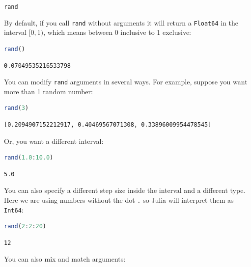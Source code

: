 \documentclass[
  notoc %
]{tufte-book}
\makeatletter
\newcommand{\passthrough}[1]{#1}
\renewcommand\subsubsection{%
\@startsection{subsubsection}{3}{\z@ }{-3.25ex\@plus -1ex \@minus -.2ex}{1.5ex \@plus .2ex}{\normalfont \normalsize \bfseries }
}
\makeatother
\begin{document}
\hypertarget{sec:random_rand}{%
\subsubsection{\texorpdfstring{\texttt{rand}}{rand}}\label{sec:random_rand}}

By default, if you call \passthrough{\lstinline!rand!} without arguments
it will return a \passthrough{\lstinline!Float64!} in the interval
\([0, 1)\), which means between 0 inclusive to 1 exclusive:

\begin{lstlisting}[language=Julia]
rand()
\end{lstlisting}

\begin{lstlisting}[language=Output]
0.07049535216533798
\end{lstlisting}

You can modify \passthrough{\lstinline!rand!} arguments in several ways.
For example, suppose you want more than 1 random number:

\begin{lstlisting}[language=Julia]
rand(3)
\end{lstlisting}

\begin{lstlisting}[language=Output]
[0.2094907152212917, 0.40469567071308, 0.33896009954478545]
\end{lstlisting}

Or, you want a different interval:

\begin{lstlisting}[language=Julia]
rand(1.0:10.0)
\end{lstlisting}

\begin{lstlisting}[language=Output]
5.0
\end{lstlisting}

You can also specify a different step size inside the interval and a
different type. Here we are using numbers without the dot
\passthrough{\lstinline!.!} so Julia will interpret them as
\passthrough{\lstinline!Int64!}:

\begin{lstlisting}[language=Julia]
rand(2:2:20)
\end{lstlisting}

\begin{lstlisting}[language=Output]
12
\end{lstlisting}

You can also mix and match arguments:
\end{document}
